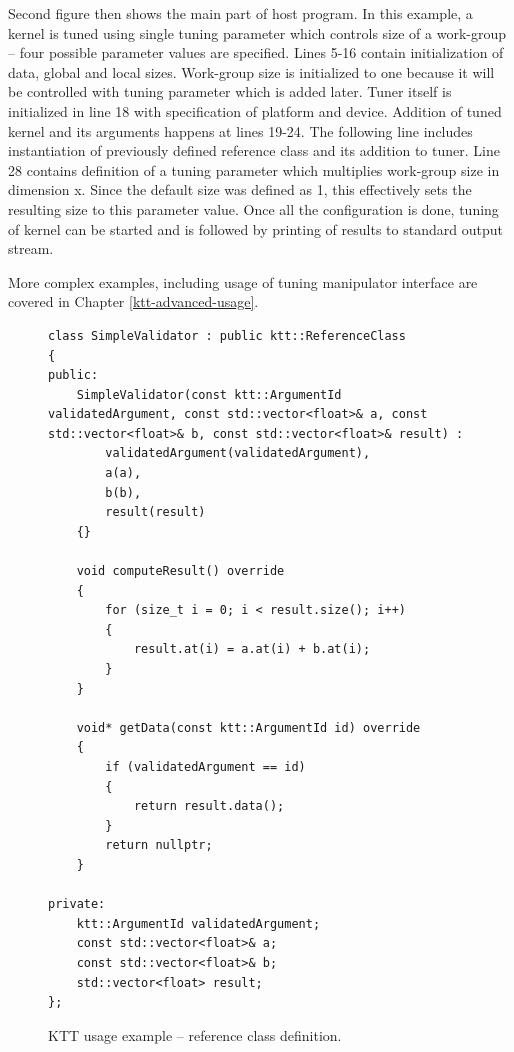 \documentclass
[
    digital, %
    oneside, %
    table, %
    nolof, %
    nolot, %
    nocover %
]{fithesis3}
\begin{document}
Second figure then shows the main part of host program. In this example, a kernel is tuned using single tuning parameter which controls size of a
work-group -- four possible parameter values are specified. Lines 5-16 contain initialization of data, global and local sizes. Work-group size is
initialized to one because it will be controlled with tuning parameter which is added later. Tuner itself is initialized in line 18 with specification
of platform and device. Addition of tuned kernel and its arguments happens at lines 19-24. The following line includes instantiation of previously
defined reference class and its addition to tuner. Line 28 contains definition of a tuning parameter which multiplies work-group size in dimension x.
Since the default size was defined as 1, this effectively sets the resulting size to this parameter value. Once all the configuration is done, tuning
of kernel can be started and is followed by printing of results to standard output stream.

More complex examples, including usage of tuning manipulator interface are covered in Chapter \ref{ktt-advanced-usage}.

\begin{figure}
\footnotesize
\begin{adjustwidth}{-1cm}{-1cm}
\begin{lstlisting}
class SimpleValidator : public ktt::ReferenceClass
{
public:
    SimpleValidator(const ktt::ArgumentId validatedArgument, const std::vector<float>& a, const std::vector<float>& b, const std::vector<float>& result) :
        validatedArgument(validatedArgument),
        a(a),
        b(b),
        result(result)
    {}
    
    void computeResult() override
    {
        for (size_t i = 0; i < result.size(); i++)
        {
            result.at(i) = a.at(i) + b.at(i);
        }
    }
    
    void* getData(const ktt::ArgumentId id) override
    {
        if (validatedArgument == id)
        {
            return result.data();
        }
        return nullptr;
    }
    
private:
    ktt::ArgumentId validatedArgument;
    const std::vector<float>& a;
    const std::vector<float>& b;
    std::vector<float> result;
};
\end{lstlisting}
\caption{KTT usage example -- reference class definition.}
\label{ktt-api-usage-reference}
\end{adjustwidth}
\end{figure}
\end{document}
